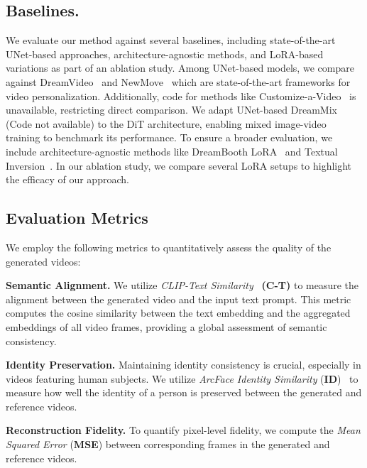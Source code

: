 \subsection{Baselines.} We evaluate our method against several baselines, including state-of-the-art UNet-based approaches, architecture-agnostic methods, and LoRA-based variations as part of an ablation study. Among UNet-based models, we compare against DreamVideo~\cite{wei2023dreamvideo} and NewMove~\cite{materzynska2024newmove} which are state-of-the-art frameworks for video personalization. Additionally, code for methods like Customize-a-Video~\cite{ren2024customize} is unavailable, restricting direct comparison. We adapt UNet-based DreamMix~\cite{molad2023dreamixvideodiffusionmodels} (Code not available) to the DiT architecture, enabling mixed image-video training to benchmark its performance. To ensure a broader evaluation, we include architecture-agnostic methods like DreamBooth  LoRA~\cite{ruiz2023dreambooth, simo} and Textual Inversion~\cite{textual_inversion}. In our ablation study, we compare several LoRA setups to highlight the efficacy of our approach.











\subsection{Evaluation Metrics}

We employ the following metrics to quantitatively assess the quality of the generated videos:

 \textbf{Semantic Alignment.} We utilize \textit{CLIP-Text Similarity~\cite{CLIP} } \textbf{(C-T)} to measure the alignment between the generated video and the input text prompt. This metric computes the cosine similarity between the text embedding and the aggregated embeddings of all video frames, providing a global assessment of semantic consistency.
 

 
\textbf{Identity Preservation.} Maintaining identity consistency is crucial, especially in videos featuring human subjects. We utilize \textit{ArcFace Identity Similarity} (\textbf{ID})~\cite{ArcFace} to measure how well the identity of a person is preserved between the generated and reference videos. 

\textbf{Reconstruction Fidelity.} To quantify pixel-level fidelity, we compute the \textit{Mean Squared Error} (\textbf{MSE}) between corresponding frames in the generated and reference videos.

